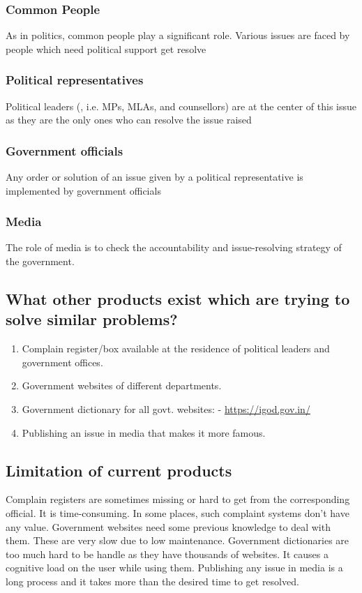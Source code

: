 \documentclass[manuscript,screen,review]{acmart}
\begin{document}
\subsubsection{Common People}
As in politics, common people play a significant role. Various issues are faced by people which need political support get resolve
\subsubsection{Political representatives}
Political leaders (, i.e. MPs, MLAs, and counsellors) are at the center of this issue as they are the only ones who can resolve the issue raised
\subsubsection{Government officials}
Any order or solution of an issue given by a political representative is implemented by government officials
\subsubsection{Media}
The role of media is to check the accountability and issue-resolving strategy of the government.

\subsection{What other products exist which are trying to solve similar problems?}
\begin{enumerate}
    \item Complain register/box available at the residence of political leaders and government offices.
    \item Government websites of different departments.
    \item Government dictionary for all govt. websites: - \url{https://igod.gov.in/}
    \item Publishing an issue in media that makes it more famous. 
\end{enumerate}

\subsection{Limitation of current products}
Complain registers are sometimes missing or hard to get from the corresponding official. It is time-consuming. In some places, such complaint systems don’t have any value.
Government websites need some previous knowledge to deal with them. These are very slow due to low maintenance.
Government dictionaries are too much hard to be handle as they have thousands of websites. It causes a cognitive load on the user while using them.
Publishing any issue in media is a long process and it takes more than the desired time to get resolved.
\end{document}
